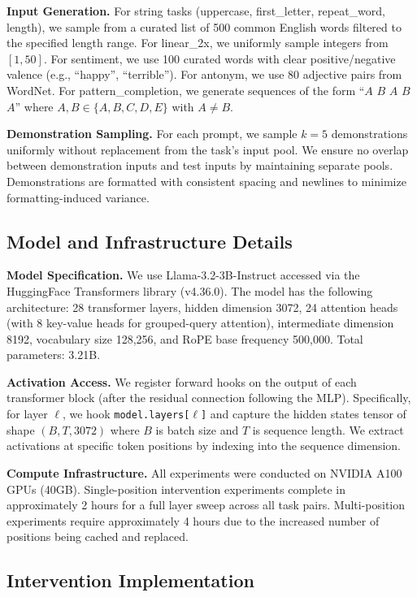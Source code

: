 \documentclass[sigconf,anonymous]{acmart}
\begin{document}
\textbf{Input Generation.} For string tasks (uppercase, first\_letter, repeat\_word, length), we sample from a curated list of 500 common English words filtered to the specified length range. For linear\_2x, we uniformly sample integers from $[1, 50]$. For sentiment, we use 100 curated words with clear positive/negative valence (e.g., ``happy'', ``terrible''). For antonym, we use 80 adjective pairs from WordNet. For pattern\_completion, we generate sequences of the form ``$A$ $B$ $A$ $B$ $A$'' where $A, B \in \{A, B, C, D, E\}$ with $A \neq B$.

\textbf{Demonstration Sampling.} For each prompt, we sample $k=5$ demonstrations uniformly without replacement from the task's input pool. We ensure no overlap between demonstration inputs and test inputs by maintaining separate pools. Demonstrations are formatted with consistent spacing and newlines to minimize formatting-induced variance.

\subsection{Model and Infrastructure Details}

\textbf{Model Specification.} We use Llama-3.2-3B-Instruct accessed via the HuggingFace Transformers library (v4.36.0). The model has the following architecture: 28 transformer layers, hidden dimension 3072, 24 attention heads (with 8 key-value heads for grouped-query attention), intermediate dimension 8192, vocabulary size 128,256, and RoPE base frequency 500,000. Total parameters: 3.21B.

\textbf{Activation Access.} We register forward hooks on the output of each transformer block (after the residual connection following the MLP). Specifically, for layer $\ell$, we hook \texttt{model.layers[$\ell$]} and capture the hidden states tensor of shape $(B, T, 3072)$ where $B$ is batch size and $T$ is sequence length. We extract activations at specific token positions by indexing into the sequence dimension.

\textbf{Compute Infrastructure.} All experiments were conducted on NVIDIA A100 GPUs (40GB). Single-position intervention experiments complete in approximately 2 hours for a full layer sweep across all task pairs. Multi-position experiments require approximately 4 hours due to the increased number of positions being cached and replaced.

\subsection{Intervention Implementation}
\end{document}
